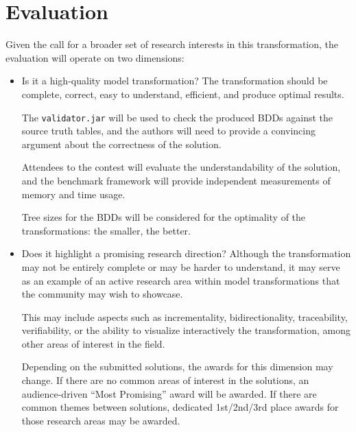 \documentclass[a4paper]{scrartcl}
\newcommand*{\file}[1]{\texttt{#1}}
\begin{document}
\section{Evaluation}
\label{sec:evaluation}

Given the call for a broader set of research interests in this transformation,
the evaluation will operate on two dimensions:

\begin{itemize}
\item Is it a high-quality model transformation? The transformation should be
  complete, correct, easy to understand, efficient, and produce optimal results.

  The \file{validator.jar} will be used to check the produced BDDs against the
  source truth tables, and the authors will need to provide a convincing
  argument about the correctness of the solution.

  Attendees to the contest will evaluate the understandability of the solution,
  and the benchmark framework will provide independent measurements of memory
  and time usage.

  Tree sizes for the BDDs will be considered for the optimality of the
  transformations: the smaller, the better.

\item Does it highlight a promising research direction? Although the
  transformation may not be entirely complete or may be harder to understand, it
  may serve as an example of an active research area within model
  transformations that the community may wish to showcase.

  This may include aspects such as incrementality, bidirectionality,
  traceability, verifiability, or the ability to visualize interactively the
  transformation, among other areas of interest in the field.

  Depending on the submitted solutions, the awards for this dimension may
  change. If there are no common areas of interest in the solutions, an
  audience-driven ``Most Promising'' award will be awarded. If there are common
  themes between solutions, dedicated 1st/2nd/3rd place awards for those
  research areas may be awarded.
\end{itemize}



\end{document}
